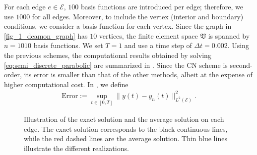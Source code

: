 \documentclass[10pt,a4paper]{amsart}
\begin{document}
For each edge $e\in\mathcal{E}$, $100$ basis functions are introduced per edge; therefore, we use $1000$ for all edges. Moreover, to include the vertex (interior and boundary) conditions, we consider a basis function for each vertex. Since the graph in \eqref{fig_1_deamon_graph} has $10$ vertices, the finite element space $\mathfrak{V}$ is spanned by $n=1010$ basis functions. We set $T=1$ and use a time step of $\Delta t = 0.002$. Using the previous schemes, the computational results obtained by solving \eqref{eq:semi_discrete_parabolic} are summarized in . Since the CN scheme is second-order, its error is smaller than that of the other methods, albeit at the expense of higher computational cost. In , we define
\begin{align*}
    \text{Error}:=\sup_{t\in[0,T]}\|y(t)-y_{n}(t)\|^2_{L^2(\mathcal{E})}.
\end{align*}
\begin{table}[h!]
\centering
\caption{Deterministic solver comparison on the full graph problem}\label{tab:deterministic}
\end{table}

\begin{figure}[h!]
    \centering
    
    \caption{Illustration of the exact solution and the average solution on each edge. The exact solution corresponds to the black continuous lines, while the red dashed lines are the average solution. Thin blue lines illustrate the different realizations.}
    \label{fig:trajectories}
\end{figure}
\end{document}
